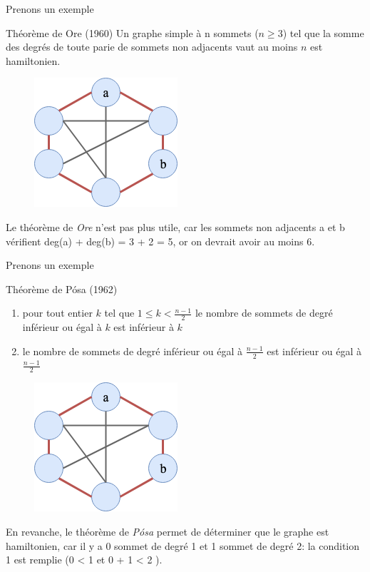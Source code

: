 \documentclass[10pt,xcolor=dvipsnames]{beamer}
\newcommand{\defin}[1]{\textcolor{darkspringgreen}{#1}}
\begin{document}
\begin{frame}{Prenons un exemple}
    \begin{exampleblock}{Théorème de Ore (1960)}
            Un graphe simple à n sommets ($n \geq 3$) tel que la somme des degrés de toute parie de sommets non adjacents vaut au moins $n$ est hamiltonien.
    \end{exampleblock}
    
        \begin{figure}
        \centering
        \includegraphics[scale=0.55]{figures/CM3/graph-theorem-hamiltonian.png}
        \label{fig:my_label}
    \end{figure}
Le théorème de \textit{Ore} n'est pas plus utile, car les sommets non adjacents a et b vérifient deg(a) + deg(b) = 3 + 2 = 5, or on devrait avoir au moins 6.
\end{frame}

\begin{frame}{Prenons un exemple}
    \begin{exampleblock}{Théorème de Pósa (1962)}
        \begin{enumerate}
            \item pour tout entier $k$ tel que $ 1\leq k<\frac {n-1}{2}$ le nombre de sommets de degré inférieur ou égal à $k$ est inférieur à $k$
            \item le nombre de sommets de degré inférieur ou égal à $\frac{n - 1}{2}$ est inférieur ou égal à $\frac{n - 1}{2}$
        \end{enumerate}
    \end{exampleblock}
     \begin{figure}
        \centering
        \includegraphics[scale=0.35]{figures/CM3/graph-theorem-hamiltonian.png}
        \label{fig:my_label}
    \end{figure}
    En revanche, le théorème de \textit{Pósa} permet de déterminer que le graphe est \defin{hamiltonien}, car il y a 0 sommet de degré 1 et 1 sommet de degré 2: la condition 1 est remplie (0 < 1 et 0 + 1 < 2 ).
\end{frame}
\end{document}
